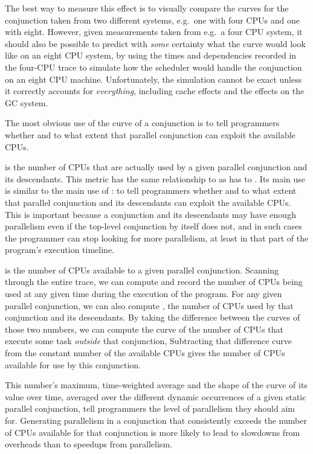 The best way to measure this effect
is to visually compare the  curves for the
conjunction taken from two different systems,
e.g.\ one with four CPUs and one with eight.
However, given measurements taken from e.g.\ a four CPU system,
it should also be possible to predict with \emph{some} certainty
what the curve would look like on an eight CPU system,
by using the times and dependencies recorded in the four-CPU trace
to simulate how the scheduler would handle the conjunction
on an eight CPU machine.
Unfortunately, the simulation cannot be exact
unless it correctly accounts for \emph{everything},
including cache effects and the effects on the GC system.

The most obvious use of the  curve of a
conjunction is to tell programmers whether and to what extent
that parallel conjunction can exploit the available CPUs.

is the number of CPUs that are actually used by a given parallel conjunction
and its descendants.
This metric has the same relationship to
as  has to
.
Its main use is similar to the main use of :
to tell programmers whether and to what extent
that parallel conjunction and its descendants can exploit the available CPUs.
This is important because a conjunction and its descendants
may have enough parallelism
even if the top-level conjunction by itself does not,
and in such cases the programmer can stop looking for more parallelism,
at least in that part of the program's execution timeline.

is the number of CPUs available to a given parallel conjunction.
Scanning through the entire trace,
we can compute and record the number of CPUs being used
at any given time during the execution of the program.
For any given parallel conjunction,
we can also compute ,
the number of CPUs used by that conjunction and its descendants.
By taking the difference between the curves of those two numbers,
we can compute the curve of the number of CPUs
that execute some task \emph{outside} that conjunction,
Subtracting that difference curve
from the constant number of the available CPUs
gives the number of CPUs available for use by this conjunction.

This number's maximum, time-weighted average
and the shape of the curve of its value over time,
averaged over the different dynamic occurrences
of a given static parallel conjunction,
tell programmers the level of parallelism they should aim for.
Generating parallelism in a conjunction
that consistently exceeds the number of CPUs available for that conjunction
is more likely to lead to slowdowns from overheads
than to speedups from parallelism.

